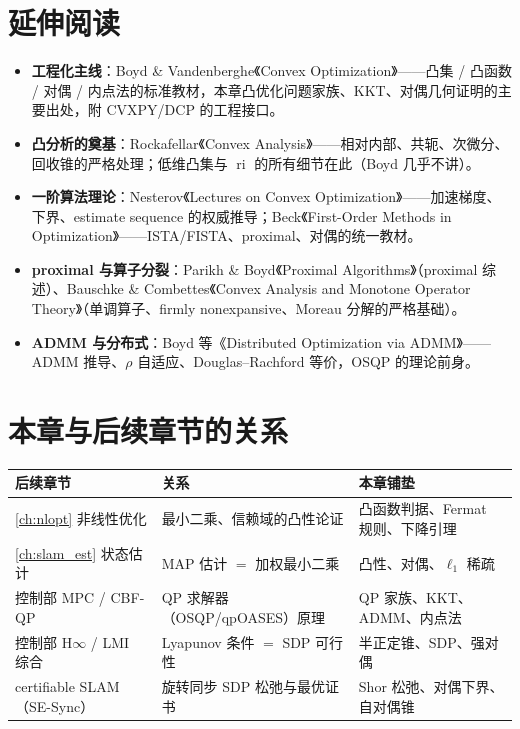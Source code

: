 \section*{延伸阅读}
\begin{itemize}
  \item \textbf{工程化主线}：Boyd \& Vandenberghe《Convex Optimization》\cite{boyd2004convex}——凸集 / 凸函数 / 对偶 / 内点法的标准教材，本章凸优化问题家族、KKT、对偶几何证明的主要出处，附 CVXPY/DCP 的工程接口。
  \item \textbf{凸分析的奠基}：Rockafellar《Convex Analysis》\cite{rockafellar1970convex}——相对内部、共轭、次微分、回收锥的严格处理；低维凸集与 $\operatorname{ri}$ 的所有细节在此（Boyd 几乎不讲）。
  \item \textbf{一阶算法理论}：Nesterov《Lectures on Convex Optimization》\cite{nesterov2018lectures}——加速梯度、下界、estimate sequence 的权威推导；Beck《First-Order Methods in Optimization》\cite{beck2017fom}——ISTA/FISTA、proximal、对偶的统一教材。
  \item \textbf{proximal 与算子分裂}：Parikh \& Boyd《Proximal Algorithms》\cite{parikh2014proximal}（proximal 综述）、Bauschke \& Combettes《Convex Analysis and Monotone Operator Theory》\cite{bauschke2017convex}（单调算子、firmly nonexpansive、Moreau 分解的严格基础）。
  \item \textbf{ADMM 与分布式}：Boyd 等《Distributed Optimization via ADMM》\cite{boyd2011admm}——ADMM 推导、$\rho$ 自适应、Douglas--Rachford 等价，OSQP 的理论前身。
\end{itemize}

\section*{本章与后续章节的关系}
\begin{table}[H]\centering\small
\label{tab:cvx-downstream}
\begin{tabular}{lll}
\toprule
后续章节 & 关系 & 本章铺垫 \\
\midrule
\cref{ch:nlopt} 非线性优化 & 最小二乘、信赖域的凸性论证 & 凸函数判据、Fermat 规则、下降引理 \\
\cref{ch:slam_est} 状态估计 & MAP 估计 $=$ 加权最小二乘 & 凸性、对偶、$\ell_1$ 稀疏 \\
控制部 MPC / CBF-QP & QP 求解器（OSQP/qpOASES）原理 & QP 家族、KKT、ADMM、内点法 \\
控制部 H$\infty$ / LMI 综合 & Lyapunov 条件 $=$ SDP 可行性 & 半正定锥、SDP、强对偶 \\
certifiable SLAM（SE-Sync） & 旋转同步 SDP 松弛与最优证书 & Shor 松弛、对偶下界、自对偶锥 \\
\bottomrule
\end{tabular}
\end{table}

